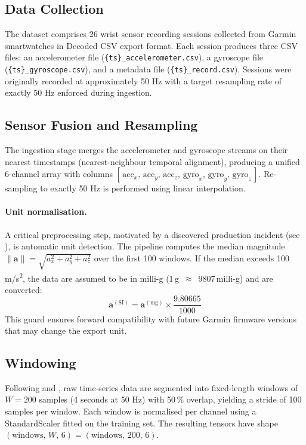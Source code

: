 \subsection{Data Collection}

The dataset comprises 26 wrist sensor recording sessions collected from
Garmin smartwatches in Decoded CSV export format.
Each session produces three CSV files: an accelerometer file
(\texttt{\{ts\}\_accelerometer.csv}), a gyroscope file
(\texttt{\{ts\}\_gyroscope.csv}), and a metadata file
(\texttt{\{ts\}\_record.csv}).
Sessions were originally recorded at approximately 50 Hz with a target
resampling rate of exactly 50 Hz enforced during ingestion.

\subsection{Sensor Fusion and Resampling}

The ingestion stage merges the accelerometer and gyroscope streams on their
nearest timestamps (nearest-neighbour temporal alignment), producing a unified
6-channel array with columns
$[\,\text{acc}_x,\,\text{acc}_y,\,\text{acc}_z,\,
   \text{gyro}_x,\,\text{gyro}_y,\,\text{gyro}_z\,]$.
Re-sampling to exactly 50 Hz is performed using linear interpolation.

\paragraph{Unit normalisation.}
A critical preprocessing step, motivated by a discovered production incident
(see ), is automatic unit detection.
The pipeline computes the median magnitude
$\|\mathbf{a}\| = \sqrt{a_x^2 + a_y^2 + a_z^2}$ over the first 100 windows.
If the median exceeds 100\,m/s\textsuperscript{2}, the data are assumed to be
in milli-g (1\,g~$\approx$~9807\,milli-g) and are converted:
\begin{equation}
  \mathbf{a}^{(\text{SI})} = \mathbf{a}^{(\text{mg})} \times
    \frac{9.80665}{1000}
\end{equation}
This guard ensures forward compatibility with future Garmin firmware versions
that may change the export unit.

\subsection{Windowing}

Following \citet{bao2004activity} and \citet{chen2021deep}, raw time-series
data are segmented into fixed-length windows of $W = 200$ samples (4 seconds at
50 Hz) with 50\,\% overlap, yielding a stride of 100 samples per window.
Each window is normalised per channel using a StandardScaler fitted on the
training set.
The resulting tensors have shape
$(\text{windows},\,W,\,6) = (\text{windows},\,200,\,6)$.


